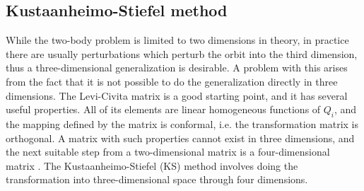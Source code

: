 \documentclass[english, oneside]{HYgradu}
\begin{document}
\subsection{Kustaanheimo-Stiefel method}
While the two-body problem is limited to two dimensions in theory, in practice there are usually perturbations which perturb the orbit into the third dimension, thus a three-dimensional generalization is desirable. A problem with this arises from the fact that it is not possible to do the generalization directly in three dimensions. The Levi-Civita matrix is a good starting point, and it has several useful properties. All of its elements are linear homogeneous functions of $Q_i$, and the mapping defined by the matrix is conformal, i.e. the transformation matrix is orthogonal. A matrix with such properties cannot exist in three dimensions, and the next suitable step from a two-dimensional matrix is a four-dimensional matrix \citep{diplomarbeit}. The Kustaanheimo-Stiefel (KS) method involves doing the transformation into three-dimensional space through four dimensions.
\end{document}
